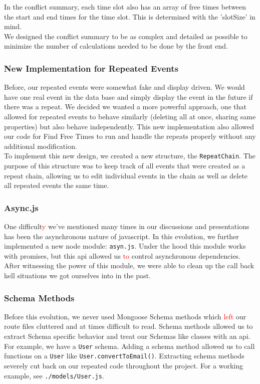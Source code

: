 \documentclass[11pt]{article}   %
\newcommand{\dcomment}[1]{\textcolor{red}{#1}}
\begin{document}
\noindent In the conflict summary, each time slot also has an array of free times between the start and end times for the time slot. This is determined with the 'slotSize' in mind. \\

\noindent We designed the conflict summary to be as complex and detailed as possible to minimize the number of calculations needed to be done by the front end.

\subsubsection{New Implementation for Repeated Events}
Before, our repeated events were somewhat fake and display driven. We would have one real event in the data base and simply display the event in the future if there was a repeat. We decided we wanted a more powerful approach, one that allowed for repeated events to behave similarly (deleting all at once, sharing same properties) but also behave independently. This new implementation also allowed our code for Find Free Times to run and handle the repeats properly without any additional modification.\\

\noindent To implement this new design, we created a new structure, the \texttt{RepeatChain}. The purpose of this structure was to keep track of all events that were created as a repeat chain, allowing us to edit individual events in the chain as well as delete all repeated events the same time.

\subsubsection{Async.js}
One difficult\dcomment{y} we've mentioned many times in our discussions and presentations has been the asynchronous nature of javascript. In this evolution, we further implemented a new node module: \texttt{asyn.js}. Under the hood this module works with promises, but this api allowed us \dcomment{to} control asynchronous dependencies. After witnessing the power of this module, we were able to clean up the call back hell situations we got ourselves into in the past.

\subsubsection{Schema Methods}
Before this evolution, we never used Mongoose Schema methods which \dcomment{left} our route files cluttered and at times difficult to read. Schema methods allowed us to extract Schema specific behavior and treat our Schemas like classes with an api. For example, we have a \texttt{User} schema. Adding a schema method allowed us to call functions on a \texttt{User} like \texttt{User.convertToEmail()}. Extracting schema methods severely cut back on our repeated code throughout the project. For a working example, see \texttt{./models/User.js}.
\end{document}
